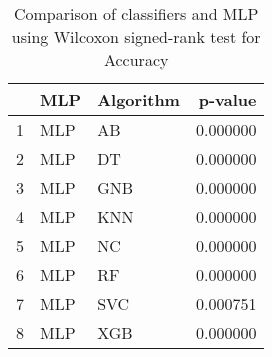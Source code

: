 \begin{table}
\footnotesize
\caption{Comparison of classifiers and MLP using Wilcoxon signed-rank test for Accuracy}
\label{tab:MLP wilcoxon Accuracy comparison}
\begin{tabular}{lllr}
\hline
 & MLP & Algorithm & p-value \\
\hline
1 & MLP & AB & 0.000000 \\
2 & MLP & DT & 0.000000 \\
3 & MLP & GNB & 0.000000 \\
4 & MLP & KNN & 0.000000 \\
5 & MLP & NC & 0.000000 \\
6 & MLP & RF & 0.000000 \\
7 & MLP & SVC & 0.000751 \\
8 & MLP & XGB & 0.000000 \\
\hline
\end{tabular}
\end{table}
